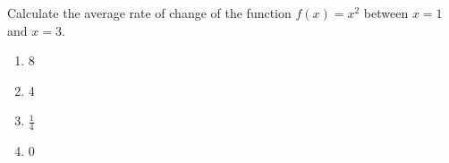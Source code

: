 \bigskip

\item Calculate the average rate of change of the function $f(x)=x^2$ between $x=1$ and $x=3$.

\begin{enumerate}
\item 8
\item 4
\item $\frac{1}{4}$
\item 0
\end{enumerate}

